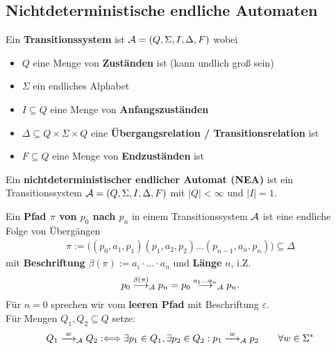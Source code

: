 \subsection{Nichtdeterministische endliche Automaten}

\begin{definition}\label{def1.1}
	Ein \textbf{Transitionssystem} ist $\mathcal{A}=(Q,\Sigma,I,\Delta,F)$ wobei
	\begin{itemize}
		\item $Q$ eine Menge von \textbf{Zuständen} ist (kann undlich groß sein)
		\item $\Sigma$ ein endliches Alphabet
		\item $I\subseteq Q$ eine Menge von \textbf{Anfangszuständen}
		\item $\Delta\subseteq Q\times \Sigma\times Q$ eine \textbf{Übergangsrelation / Transitionsrelation} ist
		\item $F\subseteq Q$ eine Menge von \textbf{Endzuständen} ist
	\end{itemize}
\end{definition}

\begin{definition}\label{def1.2}
	Ein \textbf{nichtdeterministischer endlicher Automat (NEA)} ist ein Transitionssystem $\mathcal{A}=(Q,\Sigma,I,\Delta,F)$ mit $|Q|<\infty$ und $|I|=1$.
\end{definition}

\begin{definition}\label{def1.4}
	Ein \textbf{Pfad $\pi$ von $p_0$ nach $p_n$} in einem Transitionssystem $\mathcal{A}$ ist eine endliche Folge von Übergängen
	\begin{align*}
		\pi:=\Big((p_0,a_1,p_1)(p_1,a_2,p_2)\ldots(p_{n-1},a_n,p_n)\Big)\subseteq\Delta
	\end{align*}
	mit \textbf{Beschriftung} $\beta(\pi):=a_i\cdot\ldots\cdot a_n$ und \textbf{Länge} $n$, i.Z.
	\begin{align*}
		p_0\overset{\beta(\pi)}{\longrightarrow}_{\mathcal{A}} p_n=p_0\overset{a_1\ldots a_n}{\longrightarrow}_{\mathcal{A}} p_n.
	\end{align*}
	Für $n=0$ sprechen wir vom \textbf{leeren Pfad} mit Beschriftung $\varepsilon$.\\
	Für Mengen $Q_1,Q_2\subseteq Q$ setze:
	\begin{align*}
		Q_1\overset{w}{\longrightarrow}_{\mathcal{A}} Q_2:\Longleftrightarrow\exists p_1\in Q_1,\exists p_2\in Q_2:p_1\overset{w}{\longrightarrow}_{\mathcal{A}} p_2\qquad\forall w\in\Sigma^\ast
	\end{align*}
\end{definition}

